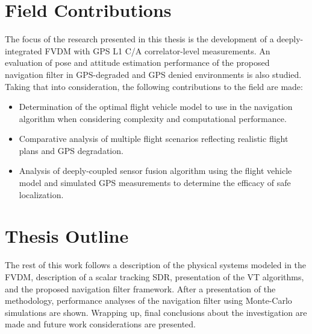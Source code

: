 \section{\textbf{Field Contributions}}
The focus of the research presented in this thesis is the development of a deeply-integrated FVDM with GPS L1 C/A correlator-level measurements. An evaluation of pose and attitude estimation performance of the proposed navigation filter in GPS-degraded and GPS denied environments is also studied. Taking that into consideration, the following contributions to the field are made:
\begin{itemize}
    \item Determination of the optimal flight vehicle model to use in the navigation algorithm when considering complexity and computational performance.
    \item Comparative analysis of multiple flight scenarios reflecting realistic flight plans and GPS degradation.
    \item Analysis of deeply-coupled sensor fusion algorithm using the flight vehicle model and simulated GPS measurements to determine the efficacy of safe localization.
\end{itemize}

\section{\textbf{Thesis Outline}}
The rest of this work follows a description of the physical systems modeled in the FVDM, description of a scalar tracking SDR, presentation of the VT algorithms, and the proposed navigation filter framework. After a presentation of the methodology, performance analyses of the navigation filter using Monte-Carlo simulations are shown. Wrapping up, final conclusions about the investigation are made and future work considerations are presented.
